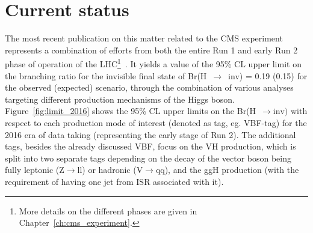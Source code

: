 
\section{Current status}
\hspace{10pt} The most recent publication on this matter related to the CMS experiment represents a combination of efforts from both the entire Run 1 and early Run 2 phase of operation of the LHC\footnote{More details on the different phases are given in Chapter~\ref{ch:cms_experiment}.}~\cite{paper:HIG_17_023}. It yields a value of the 95\% CL upper limit on the branching ratio for the invisible final state of Br(H~$\rightarrow$~inv) = 0.19 (0.15) for the observed (expected) scenario, through the combination of various analyses targeting different production mechanisms of the Higgs boson. Figure~\ref{fig:limit_2016} shows the 95\% CL upper limits on the Br(H~$\rightarrow \text{inv})$ with respect to each production mode of interest (denoted as tag, eg. VBF-tag) for the 2016 era of data taking (representing the early stage of Run 2). The additional tags, besides the already discussed VBF, focus on the VH production, which is split into two separate tags depending on the decay of the vector boson being fully leptonic (Z$\rightarrow$ll) or hadronic (V$\rightarrow$qq), and the ggH production (with the requirement of having one jet from ISR associated with it).


